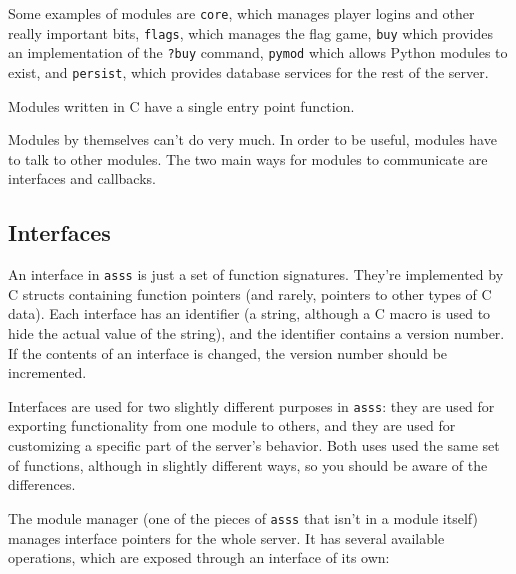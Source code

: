 \documentclass{article}
\newcommand{\asss}{\texttt{asss}}
\begin{document}
Some examples of modules are \verb/core/, which manages player logins
and other really important bits, \verb/flags/, which manages the flag
game, \verb/buy/ which provides an implementation of the \verb/?buy/
command, \verb/pymod/ which allows Python modules to exist, and
\verb/persist/, which provides database services for the rest of the
server.

Modules written in C have a single entry point function.

Modules by themselves can't do very much. In order to be useful, modules
have to talk to other modules. The two main ways for modules to
communicate are interfaces and callbacks.

\subsection{Interfaces}

An interface in \asss{} is just a set of function signatures. They're
implemented by C structs containing function pointers (and rarely,
pointers to other types of C data). Each interface has an identifier (a
string, although a C macro is used to hide the actual value of the
string), and the identifier contains a version number. If the contents
of an interface is changed, the version number should be incremented.

Interfaces are used for two slightly different purposes in \asss{}: they
are used for exporting functionality from one module to others, and they
are used for customizing a specific part of the server's behavior. Both
uses used the same set of functions, although in slightly different
ways, so you should be aware of the differences.

The module manager (one of the pieces of \asss{} that isn't in a module
itself) manages interface pointers for the whole server. It has several
available operations, which are exposed through an interface of its own:
\end{document}
